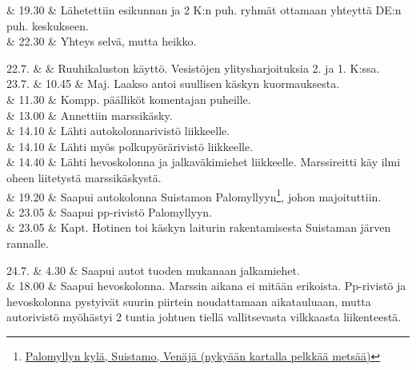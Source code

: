 \documentclass[11pt,a5paper,oneside]{book}
\begin{document}
& 19.30 & Lähetettiin esikunnan ja 2 K:n puh. ryhmät ottamaan yhteyttä DE:n puh. keskukseen. \newline \\

& 22.30 & Yhteys selvä, mutta heikko. \\
\newpage

22.7. & & Ruuhikaluston käyttö. Vesistöjen ylitysharjoituksia 2. ja 1. K:ssa. \newline\newline\newline \\

23.7. & 10.45 & Maj. Laakso antoi suullisen käskyn kuormauksesta. \\

& 11.30 & Kompp. päälliköt komentajan puheille. \\

& 13.00 & Annettiin marssikäsky. \\

& 14.10 & Lähti autokolonnarivistö liikkeelle. \\

& 14.10 & Lähti myös polkupyörärivistö liikkeelle. \\

& 14.40 & Lähti hevoskolonna ja jalkaväkimiehet liikkeelle. Marssireitti käy ilmi oheen liitetystä marssikäskystä. \\

& 19.20 & Saapui autokolonna Suistamon Palomyllyyn\footnote{\href{https://www.google.fi/maps/place/61\%C2\%B053'58.2\%22N+31\%C2\%B011'40.9\%22E/}{Palomyllyn kylä, Suistamo, Venäjä (nykyään kartalla pelkkää metsää)}}, johon majoituttiin. \newline \\

& 23.05 & Saapui pp-rivistö Palomyllyyn. \newline \\

& 23.05 & Kapt. Hotinen toi käskyn laiturin rakentamisesta Suistaman järven rannalle. \\

\taulustop


24.7. & 4.30 & Saapui autot tuoden mukanaan jalkamiehet. \newline \\

& 18.00 & Saapui hevoskolonna. \newline Marssin aikana ei mitään erikoista. Pp-rivistö ja hevoskolonna pystyivät suurin piirtein noudattamaan aikatauluaan, mutta autorivistö myöhästyi 2 tuntia johtuen tiellä vallitsevasta vilkkaasta liikenteestä. \newline\newline \\
\end{document}
